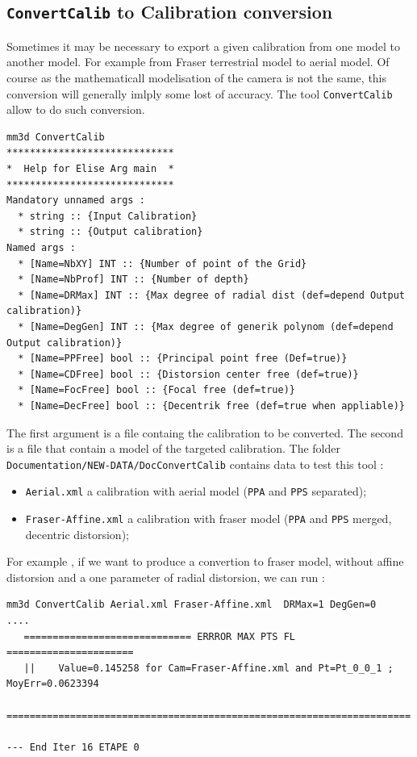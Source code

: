 
\subsection{{\tt ConvertCalib} to Calibration conversion}

Sometimes it may be necessary to export a given calibration from one model to another model. For example from Fraser terrestrial
model to aerial model. Of course as the mathematicall modelisation of the camera is not the same, this conversion will 
generally imlply some lost of accuracy.  The tool {\tt ConvertCalib} allow to do such conversion.

\begin{verbatim}
mm3d ConvertCalib
*****************************
*  Help for Elise Arg main  *
*****************************
Mandatory unnamed args : 
  * string :: {Input Calibration}
  * string :: {Output calibration}
Named args : 
  * [Name=NbXY] INT :: {Number of point of the Grid}
  * [Name=NbProf] INT :: {Number of depth}
  * [Name=DRMax] INT :: {Max degree of radial dist (def=depend Output calibration)}
  * [Name=DegGen] INT :: {Max degree of generik polynom (def=depend Output calibration)}
  * [Name=PPFree] bool :: {Principal point free (Def=true)}
  * [Name=CDFree] bool :: {Distorsion center free (def=true)}
  * [Name=FocFree] bool :: {Focal free (def=true)}
  * [Name=DecFree] bool :: {Decentrik free (def=true when appliable)}
\end{verbatim}


The first argument is a file containg the calibration to be converted. The second is a file that contain a model of the
targeted calibration. The folder {\tt Documentation/NEW-DATA/DocConvertCalib} contains data to test this tool :

\begin{itemize}
   \item  {\tt Aerial.xml} a calibration with aerial model ({\tt PPA} and {\tt PPS} separated);
   \item  {\tt Fraser-Affine.xml} a calibration with fraser model ({\tt PPA} and {\tt PPS} merged, decentric distorsion);
\end{itemize}

For example , if we want to produce a convertion to fraser model, without affine distorsion and a one parameter of radial
distorsion, we can run :

\begin{verbatim}
mm3d ConvertCalib Aerial.xml Fraser-Affine.xml  DRMax=1 DegGen=0
....
   ============================= ERRROR MAX PTS FL ======================
   ||    Value=0.145258 for Cam=Fraser-Affine.xml and Pt=Pt_0_0_1 ; MoyErr=0.0623394
   ======================================================================

--- End Iter 16 ETAPE 0

\end{verbatim}


